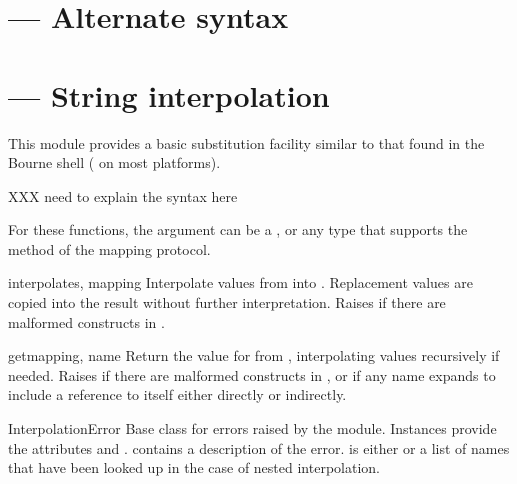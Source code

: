 \documentclass{howto}
\begin{document}


\section{ --- Alternate syntax}



\section{ --- String interpolation}


This module provides a basic substitution facility similar to that
found in the Bourne shell ( on most \UNIX{} platforms).  

XXX need to explain the syntax here

For these functions, the  argument can be a ,
or any type that supports the  method of the mapping
protocol.

\begin{funcdesc}{interpolate}{s, mapping}
  Interpolate values from  into .  Replacement
  values are copied into the result without further interpretation.
  Raises  if there are malformed
  constructs in .
\end{funcdesc}

\begin{funcdesc}{get}{mapping, name}
  Return the value for  from , interpolating
  values recursively if needed.  Raises
   if there are malformed
  constructs in , or  if
  any name expands to include a reference to itself either directly or
  indirectly.
\end{funcdesc}


\begin{excdesc}{InterpolationError}
  Base class for errors raised by the 
  module.  Instances provide the attributes  and
  .   contains a description of the
  error.   is either  or a list of names
  that have been looked up in the case of nested interpolation.
\end{excdesc}
\end{document}
